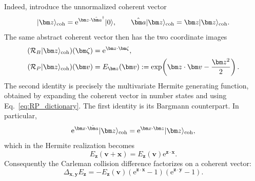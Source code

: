 \documentclass[11pt]{article}
\numberwithin{equation}{section}
\newcommand{\e}{\mathrm e}
\theoremstyle{definition}
\begin{document}
Indeed, introduce the unnormalized coherent vector
\cite{Bargmann1961,Folland1989}
\begin{equation}
 |\bm z\rangle_{\rm coh}
 =
 \e^{\bm z\cdot\hat{\bm a}^\dagger}|0\rangle,
 \qquad
 \hat{\bm a}|\bm z\rangle_{\rm coh}
 =\bm z|\bm z\rangle_{\rm coh}.
 \label{eq:coherent_vector}
\end{equation}
The same abstract coherent vector then has the two coordinate images
\begin{align}
 (\mathcal R_B|\bm z\rangle_{\rm coh})(\bm\zeta)
 &=
 \e^{\bm z\cdot\bm\zeta},
 \label{eq:coherent_Bargmann_image}
 \\
 (\mathcal R_P|\bm z\rangle_{\rm coh})(\bm v)
 &=
 E_{\bm z}(\bm v)
 :=
 \exp\!\left(\bm z\cdot\bm v-\frac{\bm z^2}{2}\right).
 \label{eq:Ez}
\end{align}
The second identity is precisely the multivariate Hermite generating
function, obtained by expanding the coherent vector in number states and
using Eq.~\eqref{eq:RP_dictionary}.  The first identity is its Bargmann
counterpart.  In particular,
\begin{equation}
 \e^{\bm x\cdot\hat{\bm a}}|\bm z\rangle_{\rm coh}
 =
 \e^{\bm x\cdot\bm z}|\bm z\rangle_{\rm coh},
 \label{eq:coherent_translation_eigen}
\end{equation}
which in the Hermite realization becomes
\begin{equation}
 E_{\bm z}(\bm v+\bm x)
 =
 E_{\bm z}(\bm v)\e^{\bm z\cdot\bm x}.
 \label{eq:Ez_translation}
\end{equation}
Consequently the Carleman collision difference factorizes on a coherent
vector:
\begin{equation}
 \Delta_{\bm x,\bm y}E_{\bm z}
 =
 -
 E_{\bm z}(\bm v)
 \left(\e^{\bm z\cdot\bm x}-1\right)
 \left(\e^{\bm z\cdot\bm y}-1\right).
 \label{eq:coherent_factorization}
\end{equation}
\end{document}
